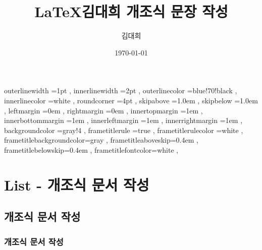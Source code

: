 \documentclass[12pt, a4paper, oneside]{book}
\let\stdsection\section
\renewcommand\section{\newpage\stdsection}
\begin{document}
	
			\noptcrule 	%
			\dominitoc 		
			\doparttoc
			\dopartlof
			\dopartlot
			
			


		\title{\LaTeX 김대희 개조식 문장 작성 }
		\author{김대희}
		\date{\today}
		\maketitle




			





		 {
						outerlinewidth		=1pt			,%
						innerlinewidth		=2pt			,%
						outerlinecolor		=blue!70!black	,%
						innerlinecolor		=white 			,%
						roundcorner			=4pt			,%
						skipabove			=1.0em 			,%
						skipbelow			=1.0em 			,%
						leftmargin			=0em			,%
						rightmargin			=0em			,%
						innertopmargin		=1em 			,%
						innerbottommargin 	=1em 			,%
						innerleftmargin		=1em 			,%
						innerrightmargin	=1em 			,%
						backgroundcolor		=gray!4			,%
						frametitlerule		=true 			,%
						frametitlerulecolor	=white			,%
						frametitlebackgroundcolor=gray		,%
						frametitleaboveskip=0.4em 			,%
						frametitlebelowskip=0.4em 			,%
						frametitlefontcolor=white 			,%
						}



					

		\part{List - 개조식 문서 작성}

		\parttoc
		\partlof
		\partlot

%
	\chapter{개조식 문서 작성}
	\minitoc				%

	\section{개조식 문서 작성}
\end{document}
